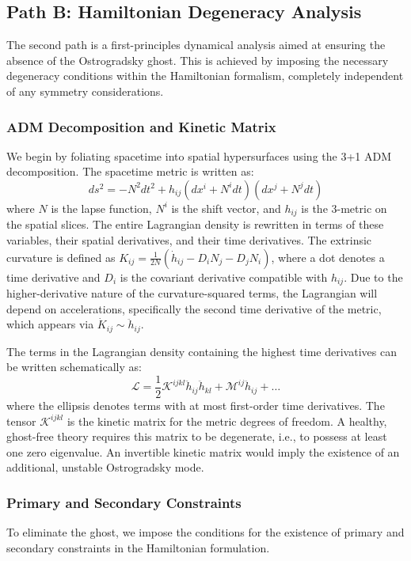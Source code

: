 \documentclass[twocolumn]{aastex631}
\begin{document}
\subsection{Path B: Hamiltonian Degeneracy Analysis}

The second path is a first-principles dynamical analysis aimed at ensuring the absence of the Ostrogradsky ghost. This is achieved by imposing the necessary degeneracy conditions within the Hamiltonian formalism, completely independent of any symmetry considerations.

\subsubsection{ADM Decomposition and Kinetic Matrix}
We begin by foliating spacetime into spatial hypersurfaces using the 3+1 ADM decomposition. The spacetime metric is written as:
\begin{equation}
ds^2 = -N^2 dt^2 + h_{ij}(dx^i + N^i dt)(dx^j + N^j dt)
\end{equation}
where $N$ is the lapse function, $N^i$ is the shift vector, and $h_{ij}$ is the 3-metric on the spatial slices. The entire Lagrangian density is rewritten in terms of these variables, their spatial derivatives, and their time derivatives. The extrinsic curvature is defined as $K_{ij} = \frac{1}{2N}(\dot{h}_{ij} - D_i N_j - D_j N_i)$, where a dot denotes a time derivative and $D_i$ is the covariant derivative compatible with $h_{ij}$. Due to the higher-derivative nature of the curvature-squared terms, the Lagrangian will depend on accelerations, specifically the second time derivative of the metric, which appears via $\dot{K}_{ij} \sim \ddot{h}_{ij}$.

The terms in the Lagrangian density containing the highest time derivatives can be written schematically as:
\begin{equation}
\mathcal{L} = \frac{1}{2} \mathcal{K}^{ijkl} \ddot{h}_{ij} \ddot{h}_{kl} + \mathcal{M}^{ij} \ddot{h}_{ij} + \dots
\end{equation}
where the ellipsis denotes terms with at most first-order time derivatives. The tensor $\mathcal{K}^{ijkl}$ is the kinetic matrix for the metric degrees of freedom. A healthy, ghost-free theory requires this matrix to be degenerate, i.e., to possess at least one zero eigenvalue. An invertible kinetic matrix would imply the existence of an additional, unstable Ostrogradsky mode.

\subsubsection{Primary and Secondary Constraints}
To eliminate the ghost, we impose the conditions for the existence of primary and secondary constraints in the Hamiltonian formulation.
\end{document}
